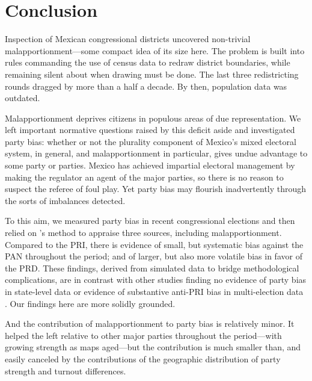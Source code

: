 \documentclass[letter,12pt]{article}
\begin{document}


\section{Conclusion}

Inspection of Mexican congressional districts uncovered non-trivial malapportionment---some compact idea of its size here. The problem is built into rules commanding the use of census data to redraw district boundaries, while remaining silent about when drawing must be done. The last three redistricting rounds dragged by more than a half a decade. By then, population data was outdated. 

Malapportionment deprives citizens in populous areas of due representation. We left important normative questions raised by this deficit aside and investigated party bias: whether or not the plurality component of Mexico's mixed electoral system, in general, and malapportionment in particular, gives undue advantage to some party or parties. Mexico has achieved impartial electoral management by making the regulator an agent of the major parties, so there is no reason to suspect the referee of foul play. Yet party bias may flourish inadvertently through the sorts of imbalances detected. 

To this aim, we measured party bias in recent congressional elections and then relied on \citeauthor{grofman.etalBiasMalapp.1997}'s method to appraise three sources, including malapportionment. Compared to the PRI, there is evidence of small, but systematic bias against the PAN throughout the period; and of larger, but also more volatile bias in favor of the PRD. These findings, derived from simulated data to bridge methodological complications, are in contrast with other studies finding no evidence of party bias in state-level data \citep{magar.altman.mcd.trelles2014uh} or evidence of substantive anti-PRI bias in multi-election data \citep{marquez2014biasBlog}. Our findings here are more solidly grounded. 

And the contribution of malapportionment to party bias is relatively minor. It helped the left relative to other major parties throughout the period---with growing strength as maps aged---but the contribution is much smaller than, and easily canceled by the contributions of the geographic distribution of party strength and turnout differences. 
\end{document}
